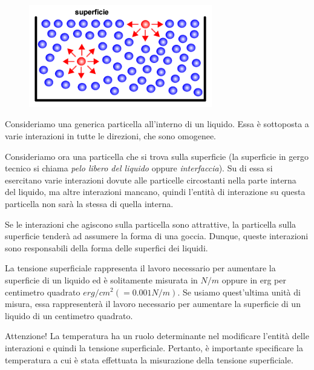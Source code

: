 \begin{figure}[htp]
   \centering
   \includegraphics[width=8cm]{immagini/tensione_superficiale.png}
\end{figure}

Consideriamo una generica particella all'interno di un liquido. Essa è sottoposta a varie interazioni in tutte le direzioni, che sono omogenee. 
   
Consideriamo ora una particella che si trova sulla superficie (la superficie in gergo tecnico si chiama \textit{pelo libero del liquido} oppure \textit{interfaccia}). Su di essa si esercitano varie interazioni dovute alle particelle circostanti nella parte interna del liquido, ma altre interazioni mancano, quindi l'entità di interazione su questa particella non sarà la stessa di quella interna.

Se le interazioni che agiscono sulla particella sono attrattive, la particella sulla superficie tenderà ad assumere la forma di una goccia. Dunque, queste interazioni sono responsabili della forma delle superfici dei liquidi.

La tensione superficiale rappresenta il lavoro necessario per aumentare la superficie di un liquido ed è solitamente misurata in $N/m$ oppure in erg per centimetro quadrato $erg/cm^2(=0.001N/m)$. Se usiamo quest'ultima unità di misura, essa rappresenterà il lavoro necessario per aumentare la superficie di un liquido di un centimetro quadrato.

Attenzione! La temperatura ha un ruolo determinante nel modificare l'entità delle interazioni e quindi la tensione superficiale. Pertanto, è importante specificare la temperatura a cui è stata effettuata la misurazione della tensione superficiale.

